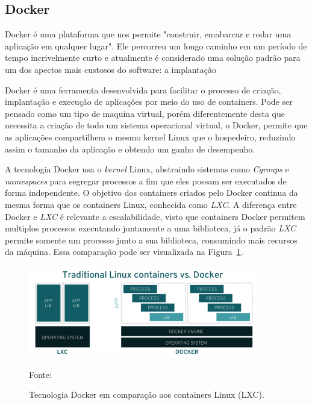 \subsection{Docker}

Docker é uma plataforma que nos permite "construir, emabarcar e rodar uma aplicação em qualquer lugar". Ele percorreu um longo caminho em um período de tempo incrivelmente curto e atualmente é considerado uma solução padrão para um dos apectos mais custosos do software: a implantação
~\cite{miellJan16}

Docker é uma ferramenta desenvolvida para facilitar o processo de criação, implantação e execução de aplicações por meio do uso de containers.
%
Pode ser pensado como um tipo de maquina virtual, porém diferentemente desta que necessita a criação de todo um sistema operacional virtual, o Docker, permite que as aplicações compartilhem o mesmo kernel Linux que o hospedeiro, reduzindo assim o tamanho da aplicação e obtendo um ganho de desempenho.


A tecnologia Docker usa o \textit{kernel} Linux, abstraindo sistemas como \textit{Cgroups} e \textit{namespaces} para segregar processos a fim que eles possam ser executados de forma independente.
%
O objetivo dos containers criados pelo Docker continua da mesma forma que  os containers Linux, conhecida como \textit{LXC}.
%
A diferença entre Docker e \textit{LXC} é relevante a escalabilidade, visto que containers Docker permitem multiplos processos executando juntamente a uma biblioteca, já o padrão \textit{LXC} permite somente um processo junto a sua biblioteca, consumindo mais recursos da máquina.
%
Essa comparação pode ser visualizada na Figura~\ref{fig:container_docker}.

\begin{figure}[htb!]
\caption{Tecnologia Docker em comparação aos containers Linux (LXC).}
\label{fig:container_docker}
\includegraphics[height=4cm]{img/cap2/traditional-linux-containers-vs-docker_0.png}
\centering

Fonte:~\cite{container}
\end{figure}



